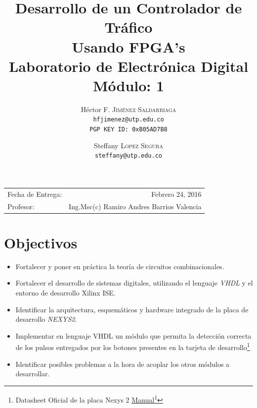 \documentclass[paper=a4, fontsize=12pt]{article} 		%
\title{Desarrollo de un Controlador de Tráfico\\ 
Usando FPGA's \\
Laboratorio de Electrónica Digital\\Módulo: 1} 			%
\author{												%
Héctor F. \textsc{Jiménez Saldarriaga}\\
\texttt{hfjimenez@utp.edu.co} \\
\texttt{PGP KEY ID: 0xB05AD7B8}
\and
Steffany \textsc{Lopez Segura}\\
\texttt{steffany@utp.edu.co}
} 												       %
\date{}    						                       %
\newcommand\fnurl[2]{%
\href{#2}{#1}\footnote{\url{#2}}%
}
\numberwithin{equation}{section}						%
\numberwithin{table}{section} 							%
\begin{document}
\maketitle                      			           %
\begin{center}
\begin{tabular}{l r}								   %
Fecha de Entrega: & Febrero 24, 2016 \\				   %
Profesor: & Ing.Msc(c) Ramiro Andres Barrios Valencia
\end{tabular}
\end{center}
\section{Objectivos}
\begin{itemize}
  \item Fortalecer y poner en práctica la teoría de circuitos combinacionales.
  \item Fortalecer el desarrollo de sistemas digitales, utilizando el lenguaje \emph{VHDL} y el entorno de desarrollo Xilinx ISE.
  \item Identificar la arquitectura, esquemáticos y hardware integrado de la placa de desarrollo \emph{NEXYS2}.
  \item Implementar en lenguaje VHDL un módulo que permita la detección correcta de los pulsos entregados por los botones presentes en la tarjeta de desarrollo\footnote{Datasheet Oficial de la placa  Nexys 2 \fnurl{Manual}{http://reference.digilentinc.com/_media/nexys:nexys2:nexys2_rm.pdf}}
  \item Identificar posibles problemas a la hora de acoplar los otros módulos a desarrollar.
\end{itemize}

\end{document}
